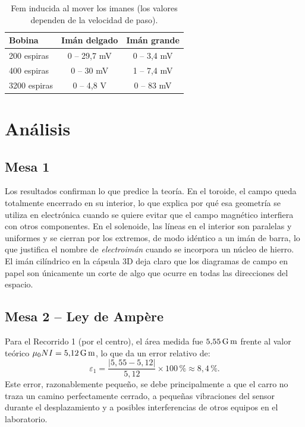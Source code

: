 \documentclass[11pt,twocolumn]{article}
\begin{document}
\begin{table}[H]
  \centering
  \caption{Fem inducida al mover los imanes (los valores dependen de la velocidad de paso).}
  \label{tab:induccion}
  \begin{tabular}{lcc}
    \toprule
    Bobina & Im\'an delgado & Im\'an grande \\
    \midrule
    200 espiras  & 0 -- 29,7 mV & 0 -- 3,4 mV \\
    400 espiras  & 0 -- 30 mV   & 1 -- 7,4 mV \\
    3200 espiras & 0 -- 4,8 V   & 0 -- 83 mV  \\
    \bottomrule
  \end{tabular}
\end{table}

\section{An\'alisis}

\subsection*{Mesa 1}

Los resultados confirman lo que predice la teor\'ia. En el toroide, el campo queda totalmente encerrado en su interior, lo que explica por qu\'e esa geometr\'ia se utiliza en electr\'onica cuando se quiere evitar que el campo magn\'etico interfiera con otros componentes. En el solenoide, las l\'ineas en el interior son paralelas y uniformes y se cierran por los extremos, de modo id\'entico a un im\'an de barra, lo que justifica el nombre de \textit{electroim\'an} cuando se incorpora un n\'ucleo de hierro. El im\'an cil\'indrico en la c\'apsula 3D deja claro que los diagramas de campo en papel son \'unicamente un corte de algo que ocurre en todas las direcciones del espacio.

\subsection*{Mesa 2 -- Ley de Amp\`ere}

Para el Recorrido 1 (por el centro), el \'area medida fue $5{,}55\,\text{G\,m}$ frente al valor te\'orico $\mu_0 NI = 5{,}12\,\text{G\,m}$, lo que da un error relativo de:
\begin{equation}
  \varepsilon_1 = \frac{|5{,}55 - 5{,}12|}{5{,}12}\times 100\,\% \approx 8{,}4\,\%.
\end{equation}
Este error, razonablemente peque\~no, se debe principalmente a que el carro no traza un camino perfectamente cerrado, a peque\~nas vibraciones del sensor durante el desplazamiento y a posibles interferencias de otros equipos en el laboratorio.
\end{document}
